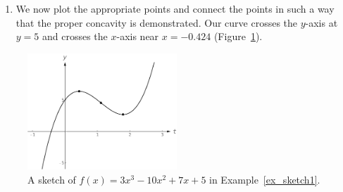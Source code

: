 \begin{example}
\begin{enumerate}
\item		We now plot the appropriate points  and connect the points in such a way that the proper concavity is demonstrated. Our curve crosses the $y$-axis at $y=5$ and crosses the $x$-axis near $x=-0.424$ (Figure~\ref{fig_behaviour_25}). 
\end{enumerate}

\begin{figure}[H]
	\begin{center}
			\includegraphics[width=0.5\textwidth]{fig_behaviour_25}
	\caption{A sketch of $f(x)= 3x^3-10x^2+7x+5$ in Example~\ref{ex_sketch1}.}
	\label{fig_behaviour_25}
	\end{center}
\end{figure}

\end{example}

